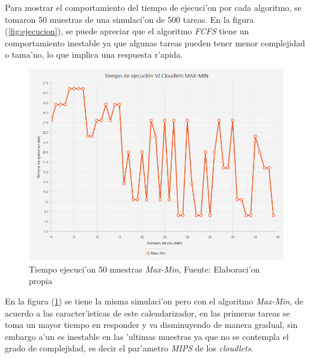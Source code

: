 Para mostrar el comportamiento del tiempo de ejecuci'on por cada algoritmo, se tomaron 50 muestras de una simulaci'on de 500 tareas. En la figura (\ref{fig:ejecucion}), se puede apreciar que el algoritmo \textit{FCFS} tiene un comportamiento inestable ya que algunas tareas pueden tener menor complejidad o tama'no, lo que implica una respuesta r'apida.

\newpage

\renewcommand\thefigure{\arabic{figure}}
\begin{figure}[h!] 
	\centering
	\includegraphics[scale=0.5]{media/max-min}
	\caption{Tiempo ejecuci'on 50 muestras \textit{Max-Min}, Fuente: Elaboraci'on propia}
	\label{fig:maxmin}
\end{figure}


 En la figura (\ref{fig:maxmin}) se tiene la misma simulaci'on pero con el algoritmo \textit{Max-Min}, de acuerdo a las caracter'isticas de este calendarizador, en las primeras tareas se toma un mayor tiempo en responder y va disminuyendo de manera gradual, sin embargo a'un es inestable en las 'ultimas muestras ya que no se contempla el grado de complejidad, es decir el par'ametro \textit{MIPS} de los \textit{cloudlets}.



